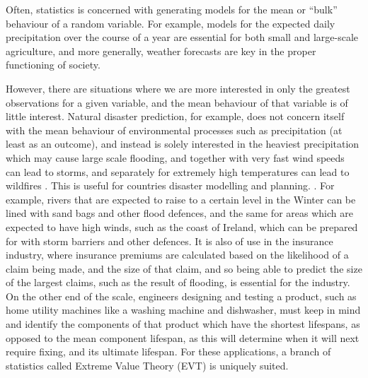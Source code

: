 \documentclass{article}
\numberwithin{equation}{section}
\begin{document}
Often, statistics is concerned with generating models for the mean or ``bulk'' behaviour of a random variable.
For example, models for the expected daily precipitation over the course of a year are essential for both small and large-scale agriculture, and more generally, weather forecasts are key in the proper functioning of society. 

However, there are situations where we are more interested in only the greatest observations for a given variable, and the mean behaviour of that variable is of little interest.
Natural disaster prediction, for example, does not concern itself with the mean behaviour of environmental processes such as precipitation (at least as an outcome), and instead is solely interested in the heaviest precipitation which may cause large scale flooding, and together with very fast wind speeds can lead to storms, and separately for extremely high temperatures can lead to wildfires .
This is useful for countries disaster modelling and planning. .
For example, rivers that are expected to raise to a certain level in the Winter can be lined with sand bags and other flood defences, and the same for areas which are expected to have high winds, such as the coast of Ireland, which can be prepared for with storm barriers and other defences. 
It is also of use in the insurance industry, where insurance premiums are calculated based on the likelihood of a claim being made, and the size of that claim, and so being able to predict the size of the largest claims, such as the result of flooding, is essential for the industry.
On the other end of the scale, engineers designing and testing a product, such as home utility machines like a washing machine and dishwasher, must keep in mind and identify the components of that product which have the shortest lifespans, as opposed to the mean component lifespan, as this will determine when it will next require fixing, and its ultimate lifespan.
For these applications, a branch of statistics called Extreme Value Theory (EVT) is uniquely suited.
\end{document}
